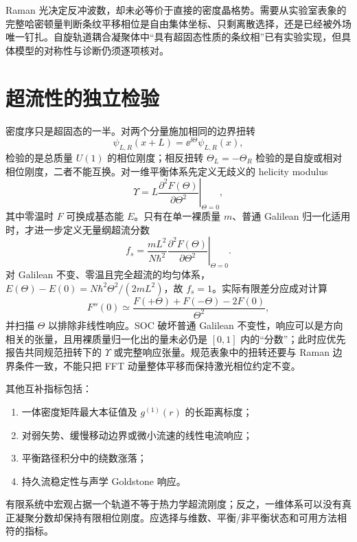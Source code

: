 Raman 光决定反冲波数，却未必等价于直接的密度晶格势。需要从实验室表象的完整哈密顿量判断条纹平移相位是自由集体坐标、只剩离散选择，还是已经被外场唯一钉扎。自旋轨道耦合凝聚体中“具有超固态性质的条纹相”已有实验实现\cite{Li2017}，但具体模型的对称性与诊断仍须逐项核对。

\section{超流性的独立检验}

密度序只是超固态的一半。对两个分量施加相同的边界扭转
\begin{equation}
  \psi_{L,R}(x+L)=\ee^{\ii\Theta}\psi_{L,R}(x),
  \label{eq:common-phase-twist-boundary}
\end{equation}
检验的是总质量 $U(1)$ 的相位刚度；相反扭转 $\Theta_L=-\Theta_R$ 检验的是自旋或相对相位刚度，二者不能互换。对一维平衡体系先定义无歧义的 helicity modulus
\begin{equation}
  \Upsilon=L\left.\frac{\partial^2F(\Theta)}{\partial\Theta^2}\right|_{\Theta=0},
  \label{eq:helicity-modulus-twist}
\end{equation}
其中零温时 $F$ 可换成基态能 $E$。只有在单一裸质量 $m$、普通 Galilean 归一化适用时，才进一步定义无量纲超流分数
\begin{equation}
  f_s=\frac{mL^2}{N\hbar^2}
  \left.\frac{\partial^2F(\Theta)}{\partial\Theta^2}\right|_{\Theta=0}.
  \label{eq:superfluid-fraction-twist}
\end{equation}
对 Galilean 不变、零温且完全超流的均匀体系，
$E(\Theta)-E(0)=N\hbar^2\Theta^2/(2mL^2)$，故 $f_s=1$。实际有限差分应成对计算
\begin{equation}
  F''(0)\simeq\frac{F(+\Theta)+F(-\Theta)-2F(0)}{\Theta^2},
  \label{eq:twist-central-difference}
\end{equation}
并扫描 $\Theta$ 以排除非线性响应。SOC 破坏普通 Galilean 不变性，响应可以是方向相关的张量，且用裸质量归一化出的量未必仍是 $[0,1]$ 内的“分数”；此时应优先报告共同规范扭转下的 $\Upsilon$ 或完整响应张量。规范表象中的扭转还要与 Raman 边界条件一致，不能只把 FFT 动量整体平移而保持激光相位约定不变。

其他互补指标包括：
\begin{enumerate}
  \item 一体密度矩阵最大本征值及 $g^{(1)}(r)$ 的长距离标度；
  \item 对弱矢势、缓慢移动边界或微小流速的线性电流响应；
  \item 平衡路径积分中的绕数涨落；
  \item 持久流稳定性与声学 Goldstone 响应。
\end{enumerate}
有限系统中宏观占据一个轨道不等于热力学超流刚度；反之，一维体系可以没有真正凝聚分数却保持有限相位刚度。应选择与维数、平衡/非平衡状态和可用方法相符的指标。

